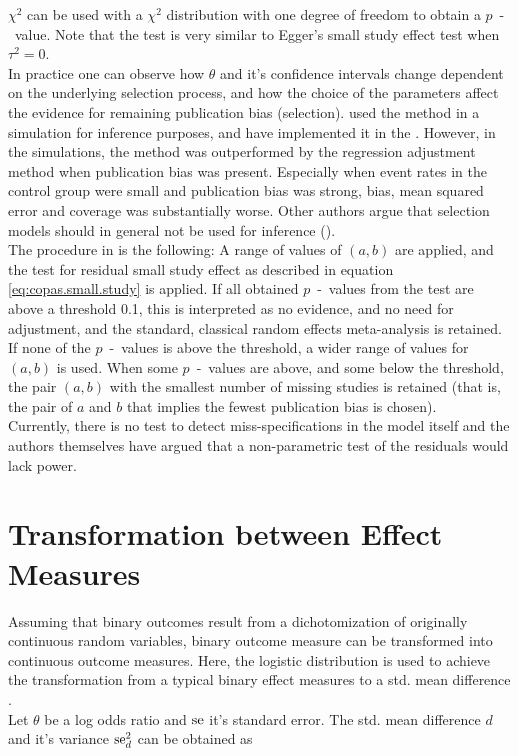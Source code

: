\documentclass[11pt,a4paper,twoside]{book}\usepackage[]{graphicx}\usepackage[]{color}
\begin{document}
$\chi^2$ can be used with a $\chi^2$ distribution with one degree of freedom to obtain a $p$\hspace{0.4mm}~-~value. Note that the test is very similar to Egger's small study effect test when $\tau^2 = 0$.\\
In practice one can observe how $\theta$ and it's confidence intervals change dependent on the underlying selection process, and how the choice of the parameters affect the evidence for remaining publication bias (selection). \citet{limitmeta} used the method in a simulation for inference purposes, and have implemented it in the \citet{meta.package}. However, in the simulations, the method was outperformed by the regression adjustment method when publication bias was present. Especially when event rates in the control group were small and publication bias was strong, bias, mean squared error and coverage was substantially worse. Other authors argue that selection models should in general not be used for inference (\eg \citealp{selection.assessment}).\\
The procedure in \citet{limitmeta} is the following: A range of values of $(a,b)$ are applied, and the test for residual small study effect as described in equation \eqref{eq:copas.small.study} is applied. If all obtained  $p$\hspace{0.4mm}~-~values from the test are above a threshold 0.1, this is interpreted as no evidence, and no need for adjustment, and the standard, classical random effects meta-analysis is retained. If none of the  $p$\hspace{0.4mm}~-~values is above the threshold, a wider range of values for $(a,b)$ is used. When some  $p$\hspace{0.4mm}~-~values are above, and some below the threshold, the pair $(a,b)$ with the smallest number of missing studies is retained (that is, the pair of $a$ and $b$ that implies the fewest publication bias is chosen).\\
Currently, there is no test to detect miss-specifications in the model itself and the authors themselves have argued that a non-parametric test of the residuals would lack power.



\section{Transformation between Effect Measures} \label{sec:transformation.effectsizes}
Assuming that binary outcomes result from a dichotomization of originally continuous random variables, binary outcome measure can be transformed into continuous outcome measures. Here, the logistic distribution is used to achieve the transformation from a typical binary effect measures to a std. mean difference \cite[47]{Intro.meta}.\\
Let $\theta$ be a log odds ratio and $\operatorname{se}$ it's standard error. The std. mean difference $d$ and it's variance $\operatorname{se}_d^2$ can be obtained as
\end{document}
